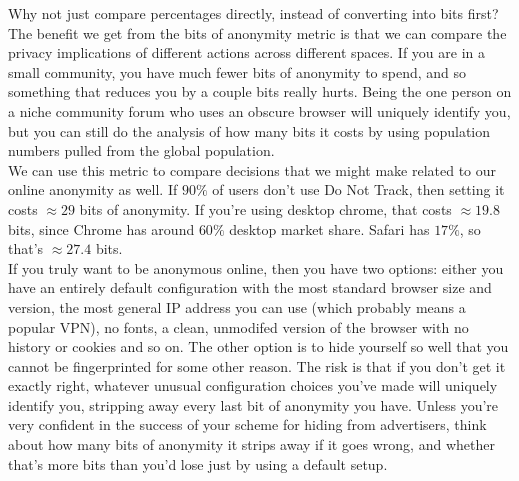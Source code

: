 \documentclass{article}
\begin{document}
Why not just compare percentages directly, instead of converting into bits first? The benefit we get from the bits of anonymity metric is that we can compare the privacy implications of different actions across different spaces. If you are in a small community, you have much fewer bits of anonymity to spend, and so something that reduces you by a couple bits really hurts. Being the one person on a niche community forum who uses an obscure browser will uniquely identify you, but you can still do the analysis of how many bits it costs by using population numbers pulled from the global population.\\

We can use this metric to compare decisions that we might make related to our online anonymity as well. If $90\%$ of users don't use Do Not Track, then setting it costs $\approx 29$ bits of anonymity. If you're using desktop chrome, that costs $\approx 19.8$ bits, since Chrome has around $60\%$ desktop market share. Safari has $17\%$, so that's $\approx 27.4$ bits.\\

If you truly want to be anonymous online, then you have two options: either you have an entirely default configuration with the most standard browser size and version, the most general IP address you can use (which probably means a popular VPN), no fonts, a clean, unmodifed version of the browser with no history or cookies and so on. The other option is to hide yourself so well that you cannot be fingerprinted for some other reason. The risk is that if you don't get it exactly right, whatever unusual configuration choices you've made will uniquely identify you, stripping away every last bit of anonymity you have. Unless you're very confident in the success of your scheme for hiding from advertisers, think about how many bits of anonymity it strips away if it goes wrong, and whether that's more bits than you'd lose just by using a default setup.\\
\end{document}

